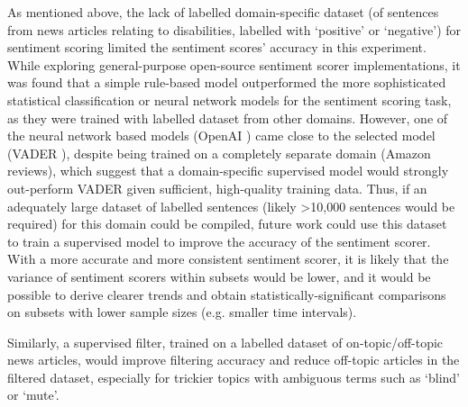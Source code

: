\documentclass{report}
\begin{document}
As mentioned above, the lack of labelled domain-specific dataset (of sentences from news articles relating to disabilities, labelled with `positive' or `negative') for sentiment scoring limited the sentiment scores' accuracy in this experiment.
While exploring general-purpose open-source sentiment scorer implementations, it was found that a simple rule-based model outperformed the more sophisticated statistical classification or neural network models for the sentiment scoring task, as they were trained with labelled dataset from other domains.
However, one of the neural network based models (OpenAI \cite{OpenAI}) came close to the selected model (VADER \cite{VADER}), despite being trained on a completely separate domain (Amazon reviews), which suggest that a domain-specific supervised model would strongly out-perform VADER given sufficient, high-quality training data.
Thus, if an adequately large dataset of labelled sentences (likely \textgreater10,000 sentences would be required) for this domain could be compiled, future work could use this dataset to train a supervised model to improve the accuracy of the sentiment scorer.
With a more accurate and more consistent sentiment scorer, it is likely that the variance of sentiment scorers within subsets would be lower, and it would be possible to derive clearer trends and obtain statistically-significant comparisons on subsets with lower sample sizes (e.g. smaller time intervals).

Similarly, a supervised filter, trained on a labelled dataset of on-topic/off-topic news articles, would improve filtering accuracy and reduce off-topic articles in the filtered dataset, especially for trickier topics with ambiguous terms such as `blind' or `mute'.
\end{document}

